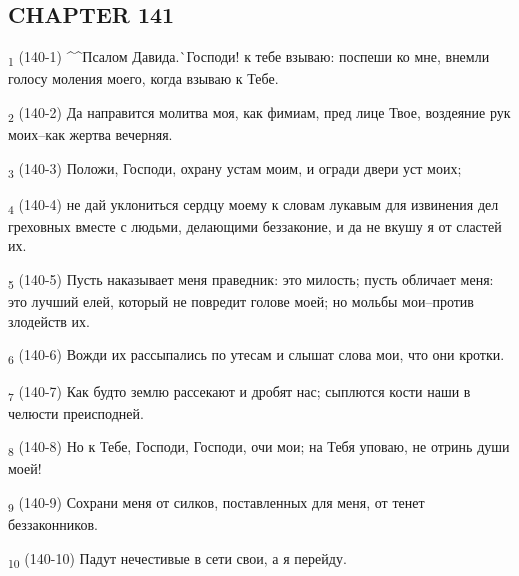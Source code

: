 \subsection{CHAPTER 141}
\begin{tcolorbox}
\textsubscript{1} (140-1) ^^Псалом Давида.^^ Господи! к тебе взываю: поспеши ко мне, внемли голосу моления моего, когда взываю к Тебе.
\end{tcolorbox}
\begin{tcolorbox}
\textsubscript{2} (140-2) Да направится молитва моя, как фимиам, пред лице Твое, воздеяние рук моих--как жертва вечерняя.
\end{tcolorbox}
\begin{tcolorbox}
\textsubscript{3} (140-3) Положи, Господи, охрану устам моим, и огради двери уст моих;
\end{tcolorbox}
\begin{tcolorbox}
\textsubscript{4} (140-4) не дай уклониться сердцу моему к словам лукавым для извинения дел греховных вместе с людьми, делающими беззаконие, и да не вкушу я от сластей их.
\end{tcolorbox}
\begin{tcolorbox}
\textsubscript{5} (140-5) Пусть наказывает меня праведник: это милость; пусть обличает меня: это лучший елей, который не повредит голове моей; но мольбы мои--против злодейств их.
\end{tcolorbox}
\begin{tcolorbox}
\textsubscript{6} (140-6) Вожди их рассыпались по утесам и слышат слова мои, что они кротки.
\end{tcolorbox}
\begin{tcolorbox}
\textsubscript{7} (140-7) Как будто землю рассекают и дробят нас; сыплются кости наши в челюсти преисподней.
\end{tcolorbox}
\begin{tcolorbox}
\textsubscript{8} (140-8) Но к Тебе, Господи, Господи, очи мои; на Тебя уповаю, не отринь души моей!
\end{tcolorbox}
\begin{tcolorbox}
\textsubscript{9} (140-9) Сохрани меня от силков, поставленных для меня, от тенет беззаконников.
\end{tcolorbox}
\begin{tcolorbox}
\textsubscript{10} (140-10) Падут нечестивые в сети свои, а я перейду.
\end{tcolorbox}
